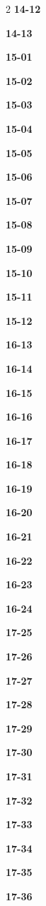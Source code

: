 \documentclass[10pt,a4paper]{article}
\begin{document}
\begin{multicols}{2}
\noindent\textbf{14-12}\ \par
\noindent\textbf{14-13}\ \par
\noindent\textbf{15-01}\ \par
\noindent\textbf{15-02}\ \par
\noindent\textbf{15-03}\ \par
\noindent\textbf{15-04}\ \par
\noindent\textbf{15-05}\ \par
\noindent\textbf{15-06}\ \par
\noindent\textbf{15-07}\ \par
\noindent\textbf{15-08}\ \par
\noindent\textbf{15-09}\ \par
\noindent\textbf{15-10}\ \par
\noindent\textbf{15-11}\ \par
\noindent\textbf{15-12}\ \par
\noindent\textbf{16-13}\ \par
\noindent\textbf{16-14}\ \par
\noindent\textbf{16-15}\ \par
\noindent\textbf{16-16}\ \par
\noindent\textbf{16-17}\ \par
\noindent\textbf{16-18}\ \par
\noindent\textbf{16-19}\ \par
\noindent\textbf{16-20}\ \par
\noindent\textbf{16-21}\ \par
\noindent\textbf{16-22}\ \par
\noindent\textbf{16-23}\ \par
\noindent\textbf{16-24}\ \par
\noindent\textbf{17-25}\ \par
\noindent\textbf{17-26}\ \par
\noindent\textbf{17-27}\ \par
\noindent\textbf{17-28}\ \par
\noindent\textbf{17-29}\ \par
\noindent\textbf{17-30}\ \par
\noindent\textbf{17-31}\ \par
\noindent\textbf{17-32}\ \par
\noindent\textbf{17-33}\ \par
\noindent\textbf{17-34}\ \par
\noindent\textbf{17-35}\ \par
\noindent\textbf{17-36}\ \par

\end{multicols}
\end{document}

